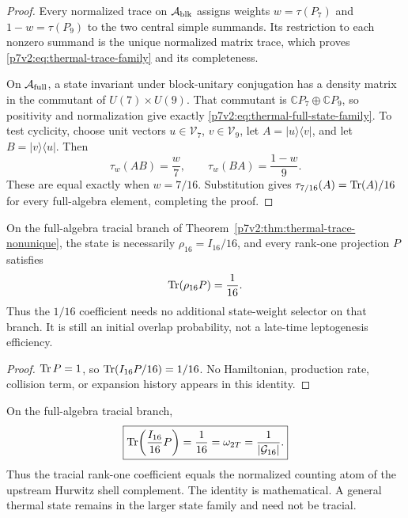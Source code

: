 \documentclass[12pt,a4paper]{article}
\begin{document}
\begin{proof}
Every normalized trace on \(\mathcal A_{\rm blk}\) assigns weights
\(w=\tau(P_7)\) and \(1-w=\tau(P_9)\) to the two central simple summands.  Its
restriction to each nonzero summand is the unique normalized matrix trace,
which proves \eqref{p7v2:eq:thermal-trace-family} and its completeness.

On \(\mathcal A_{\rm full}\), a state invariant under block-unitary
conjugation has a density matrix in the commutant of
\(U(7)\times U(9)\).  That commutant is
\(\mathbb C P_7\oplus\mathbb C P_9\), so positivity and normalization give
exactly \eqref{p7v2:eq:thermal-full-state-family}.  To test cyclicity, choose
unit vectors \(u\in\mathcal V_7\), \(v\in\mathcal V_9\), let
\(A=|u\rangle\langle v|\), and let \(B=|v\rangle\langle u|\).  Then
\[
 \tau_w(AB)=\frac w7,
 \qquad
 \tau_w(BA)=\frac{1-w}{9}.
\]
These are equal exactly when \(w=7/16\).  Substitution gives
\(\tau_{7/16}(A)=\operatorname{Tr}(A)/16\) for every full-algebra element, completing the
proof.
\end{proof}

\begin{corollary}
\label{p7v2:cor:rank-one-overlap}
On the full-algebra tracial branch of
Theorem~\ref{p7v2:thm:thermal-trace-nonunique}, the state is necessarily
\(\rho_{16}=I_{16}/16\), and every rank-one projection \(P\) satisfies
\begin{equation}
\label{p7v2:eq:rank-one-overlap}
 \operatorname{Tr}(\rho_{16}P)=\frac1{16}.
\end{equation}
Thus the \(1/16\) coefficient needs no additional state-weight selector on
that branch.  It is still an initial overlap probability, not a late-time
leptogenesis efficiency.
\end{corollary}

\begin{proof}
\(\operatorname{Tr} P=1\), so
\(\operatorname{Tr}(I_{16}P/16)=1/16\).  No Hamiltonian, production rate, collision term,
or expansion history appears in this identity.
\end{proof}

\begin{corollary}
\label{p7v2:cor:rank-one-overlap-shell-origin}
On the full-algebra tracial branch,
\begin{equation}
\label{p7v2:eq:rank-one-overlap-shell-origin}
 \boxed{\operatorname{Tr}\!\left(\frac{I_{16}}{16}P\right)
 =\frac1{16}
 =\omega_{2T}
 =\frac1{|\mathcal G_{16}|}.}
\end{equation}
Thus the tracial rank-one coefficient equals the normalized counting atom of
the upstream Hurwitz shell complement.  The identity is mathematical.  A
general thermal state remains in the larger state family and need not be
tracial.
\end{corollary}
\end{document}
